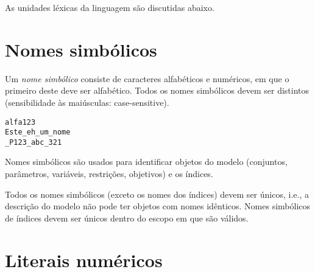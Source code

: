 \documentclass[11pt, brazil]{report}
\def\para#1{\noindent{\bf#1}}
\begin{document}

As unidades léxicas da linguagem são discutidas abaixo.


\section{Nomes simbólicos}

Um {\it nome simbólico} consiste de caracteres alfabéticos e numéricos,
em que o primeiro deste deve ser alfabético. Todos os nomes simbólicos
devem ser distintos (sensibilidade às maiúsculas: case-sensitive).


\para{Exemplos}

\begin{verbatim}
alfa123
Este_eh_um_nome
_P123_abc_321
\end{verbatim}

Nomes simbólicos são usados para identificar objetos do modelo
(conjuntos, parâmetros, \linebreak variáveis, restrições, objetivos)
e os índices.


Todos os nomes simbólicos (exceto os nomes dos índices) devem ser únicos,
i.e., a descrição do modelo não pode ter objetos com nomes idênticos.
Nomes simbólicos de índices devem ser únicos dentro do escopo em que são válidos.


\section{Literais numéricos}
\end{document}
